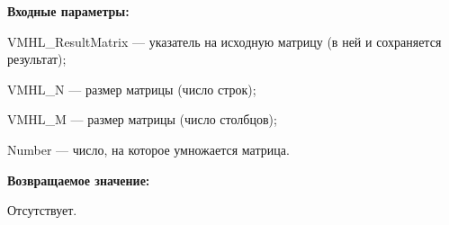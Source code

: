 \textbf{Входные параметры:}

 VMHL\_ResultMatrix --- указатель на исходную матрицу (в ней и сохраняется результат);
 
 VMHL\_N --- размер матрицы (число строк);
 
 VMHL\_M --- размер матрицы (число столбцов);
 
 Number --- число, на которое умножается матрица.

\textbf{Возвращаемое значение:}

Отсутствует.